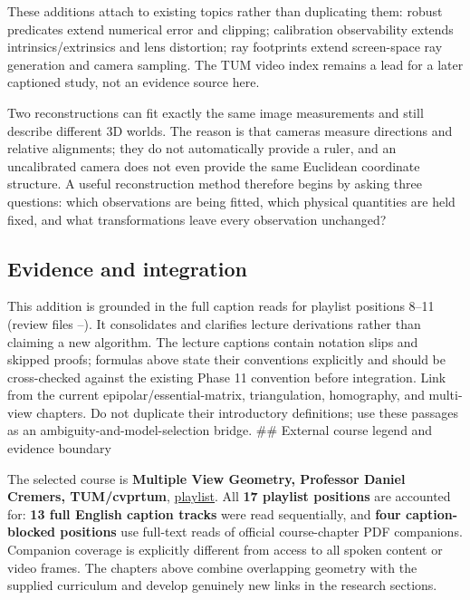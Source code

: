 \hypertarget{02-foundations-ii-ch039-relationship-to-existing-phase-11-material}{}

These additions attach to existing topics rather than duplicating them: robust predicates extend numerical error and clipping; calibration observability extends intrinsics/extrinsics and lens distortion; ray footprints extend screen-space ray generation and camera sampling. The TUM video index remains a lead for a later captioned study, not an evidence source here.

Two reconstructions can fit exactly the same image measurements and still describe different 3D worlds. The reason is that cameras measure directions and relative alignments; they do not automatically provide a ruler, and an uncalibrated camera does not even provide the same Euclidean coordinate structure. A useful reconstruction method therefore begins by asking three questions: which observations are being fitted, which physical quantities are held fixed, and what transformations leave every observation unchanged?

\subsection{Evidence and integration}\label{02-foundations-ii-ch039-evidence-and-integration}

\hypertarget{02-foundations-ii-ch039-evidence-and-integration}{}

This addition is grounded in the full caption reads for playlist positions 8--11 (review files --). It consolidates and clarifies lecture derivations rather than claiming a new algorithm. The lecture captions contain notation slips and skipped proofs; formulas above state their conventions explicitly and should be cross-checked against the existing Phase 11 convention before integration. Link from the current epipolar/essential-matrix, triangulation, homography, and multi-view chapters. Do not duplicate their introductory definitions; use these passages as an ambiguity-and-model-selection bridge. \#\# External course legend and evidence boundary

The selected course is \textbf{Multiple View Geometry, Professor Daniel Cremers, TUM/cvprtum}, \href{https://www.youtube.com/playlist?list=PLTBdjV_4f-EJn6udZ34tht9EVIW7lbeo4}{playlist}. All \textbf{17 playlist positions} are accounted for: \textbf{13 full English caption tracks} were read sequentially, and \textbf{four caption-blocked positions} use full-text reads of official course-chapter PDF companions. Companion coverage is explicitly different from access to all spoken content or video frames. The chapters above combine overlapping geometry with the supplied curriculum and develop genuinely new links in the research sections.

